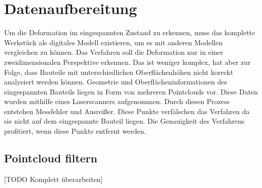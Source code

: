 

\chapter{Datenaufbereitung}

Um die Deformation im eingespannten Zustand zu erkennen, muss das komplette Werkstück
als digitales Modell existieren, um es mit anderen Modellen vergleichen zu können.
Das Verfahren soll die Deformation nur in einer zweidimensionalen Perspektive erkennen. 
Das ist weniger komplex, hat aber zur Folge, dass Bauteile mit unterschiedlichen 
Oberflächenhöhen nicht korrekt analysiert werden können. 
Geometrie und Oberflächeninformationen des eingespannten Bauteils liegen 
in Form von mehreren Pointclouds vor.
Diese Daten wurden mithilfe eines Laserscanners aufgenommen. Durch diesen Prozess 
entstehen Messfehler und Ausreißer. Diese Punkte verfälschen das Verfahren da sie 
nicht auf dem eingespannte Bauteil liegen. Die Genauigkeit des Verfahrens profitiert, 
wenn diese Punkte entfernt werden.

\section{Pointcloud filtern} [TODO Komplett überarbeiten]

